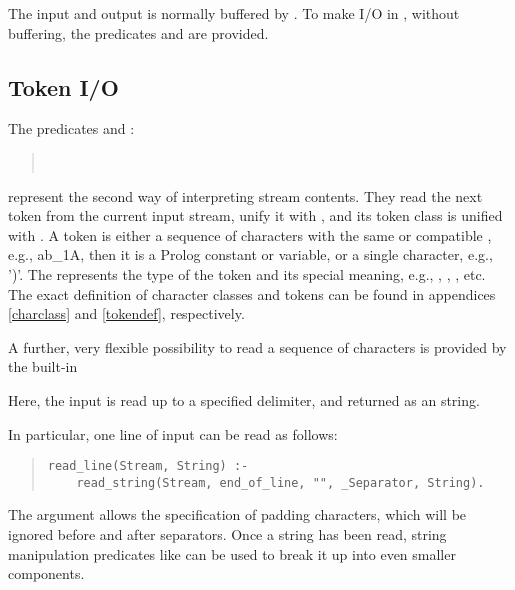 The input and output is normally buffered by {\eclipse}.
To make I/O in , without buffering, the
predicates
%
and
%
are provided.

\subsection{Token I/O}
The predicates
 and
:
\begin{quote}
\\
\end{quote}
represent the second way of interpreting stream contents.
They read the next token from the current
input stream, unify it with ,
and its token class is unified with .
A token is either a sequence of characters with the same or compatible
, e.g., ab_1A, then it is a Prolog constant
or variable, or a single character, e.g., ')'.
The  represents the type of the token and
its special meaning, e.g., , ,
, etc.
The exact definition of character classes and tokens can be found in
appendices \ref{charclass} and \ref{tokendef}, respectively.

A further, very flexible possibility to read a sequence of
characters is provided by the built-in
\begin{quote}
\end{quote}
Here, the input is read up to a specified delimiter,
and returned as an {\eclipse} string.

In particular, one line of input can be read as follows:
\begin{quote}
\begin{verbatim}
read_line(Stream, String) :-
    read_string(Stream, end_of_line, "", _Separator, String).
\end{verbatim}
\end{quote}
The  argument allows the specification of padding
characters, which will be ignored before and after separators.
Once a string has been read, string manipulation predicates like
can be used to break it up into even smaller components.



